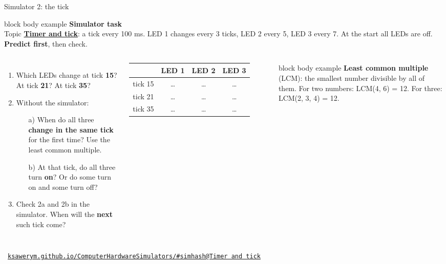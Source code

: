 \documentclass[aspectratio=169,10pt]{beamer}
\makeatletter
\newcommand{\defbox}[1]{%
  \begin{beamercolorbox}[rounded=true,sep=0.1cm,wd=\linewidth]{block body example}
    \footnotesize #1
  \end{beamercolorbox}\vspace{0.06cm}}
\newcommand{\taskhead}[2]{%
  \begin{beamercolorbox}[rounded=true,sep=0.12cm,wd=\linewidth]{block body example}
    \small\textbf{#1}\\[0.04cm]
    \footnotesize #2
  \end{beamercolorbox}\vspace{0.1cm}}
\newcommand{\simbase}{https://ksawerym.github.io/ComputerHardwareSimulators/}
\newcommand{\simhash}[1]{\csname simhash@#1\endcsname}
\newcommand{\simtab}[1]{\href{\simbase\#\simhash{#1}}{\textcolor{DeepBlue}{\textbf{#1}}}}
\newcommand{\simaddr}[1]{\href{\simbase\#\simhash{#1}}{\texttt{ksawerym.github.io/ComputerHardwareSimulators/\#\simhash{#1}}}}
\newcommand{\simfoot}[1]{\par\vfill{\hfill\scriptsize\textcolor{gray}{\faLink\ #1}\par}}
\makeatother
\begin{document}
\begin{frame}{Simulator 2: the tick}
  \taskhead{Simulator task}{Topic \simtab{Timer and tick}: a tick every 100 ms. LED 1 changes every 3 ticks,
    LED 2 every 5, LED 3 every 7. At the start all LEDs are off. \textbf{Predict first}, then check.}
  \begin{columns}[T,onlytextwidth]
      \footnotesize
      \begin{enumerate}\setlength{\itemsep}{4pt}
        \item Which LEDs change at tick \textbf{15}? At tick \textbf{21}? At tick \textbf{35}?
        \item Without the simulator:
          \begin{enumerate}
            \item[a)] When do all three \textbf{change in the same tick} for the first time? Use the least common
              multiple.
            \item[b)] At that tick, do all three turn \textbf{on}? Or do some turn on and some turn off?
          \end{enumerate}
        \item Check 2a and 2b in the simulator. When will the \textbf{next} such tick come?
      \end{enumerate}
      \centering\footnotesize
      \renewcommand{\arraystretch}{1.2}
      \begin{tabular}{cccc}
        \toprule
        & \textbf{LED 1} & \textbf{LED 2} & \textbf{LED 3} \\
        \midrule
        tick 15 & \ldots & \ldots & \ldots \\
        tick 21 & \ldots & \ldots & \ldots \\
        tick 35 & \ldots & \ldots & \ldots \\
        \bottomrule
      \end{tabular}
      \vspace{0.15cm}
      \defbox{\textbf{Least common multiple} (LCM): the smallest number divisible by all of them.
        For two numbers: LCM(4, 6) = 12. For three: LCM(2, 3, 4) = 12.}
  \end{columns}
  \simfoot{\simaddr{Timer and tick}}
\end{frame}
\end{document}
